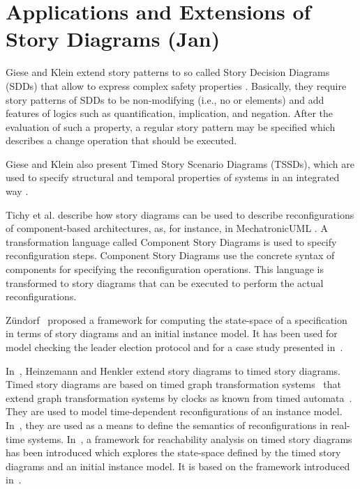 





\section{Applications and Extensions of Story Diagrams (Jan)}
Giese and Klein extend story patterns to so called Story Decision Diagrams (SDDs) that allow to express complex safety properties \cite{GK06a}.
Basically, they require story patterns of SDDs to be non-modifying (i.e., no \create or \destroy elements) and add features of logics such as quantification, implication, and negation.
After the evaluation of such a property, a regular story pattern may be specified which describes a change operation that should be executed.

Giese and Klein also present Timed Story Scenario Diagrams (TSSDs), which are used to specify structural and temporal properties of systems in an integrated way \cite{KG07a}.

Tichy et al. \cite{THH+08} describe how story diagrams can be used to describe reconfigurations of component-based architectures, as, for instance, in MechatronicUML \cite{BBD+12}.
A transformation language called Component Story Diagrams is used to specify reconfiguration steps.
Component Story Diagrams use the concrete syntax of components for specifying the reconfiguration operations.
This language is transformed to story diagrams that can be executed to perform the actual reconfigurations.

Z{\"u}ndorf~\cite{Zue09} proposed a framework for computing the state-space of a specification in terms of story diagrams and an initial instance model. 
It has been used for model checking the leader election protocol and for a case study presented in~\cite{HSJZ10}.

In~\cite{HH11b}, Heinzemann and Henkler extend story diagrams to timed story diagrams. 
Timed story diagrams are based on timed graph transformation systems~\cite{EHH+11} that extend graph transformation systems by clocks as known from timed automata~\cite{AD94}. 
They are used to model time-dependent reconfigurations of an instance model. 
In~\cite{EHH+11}, they are used as a means to define the semantics of reconfigurations in real-time systems. 
In~\cite{HSE10}, a framework for reachability analysis on timed story diagrams has been introduced which explores the state-space defined by the timed story diagrams and an initial instance model. 
It is based on the framework introduced in~\cite{Zue09}.


